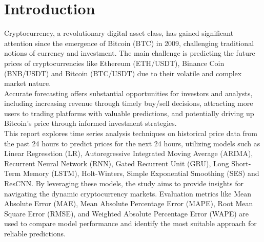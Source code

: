 \documentclass{ieeeojies}
\begin{document}
\section{Introduction}
\label{sec:introduction}
Cryptocurrency, a revolutionary digital asset class, has gained significant attention since the emergence of Bitcoin (BTC) in 2009, challenging traditional notions of currency and investment. The main challenge is predicting the future prices of cryptocurrencies like Ethereum (ETH/USDT), Binance Coin (BNB/USDT) and Bitcoin (BTC/USDT) due to their volatile and complex market nature.\\
Accurate forecasting offers substantial opportunities for investors and analysts, including increasing revenue through timely buy/sell decisions, attracting more users to trading platforms with valuable predictions, and potentially driving up Bitcoin's price through informed investment strategies.\\
This report explores time series analysis techniques on historical price data from the past 24 hours to predict prices for the next 24 hours, utilizing models such as Linear Regresstion (LR), Autoregressive Integrated Moving Average (ARIMA), Recurrent Neural Network (RNN), Gated Recurrent Unit (GRU), Long Short-Term Memory (LSTM), Holt-Winters, Simple Exponential Smoothing (SES) and ResCNN. By leveraging these models, the study aims to provide insights for navigating the dynamic cryptocurrency markets. Evaluation metrics like Mean Absolute Error (MAE), Mean Absolute Percentage Error (MAPE), Root Mean Square Error (RMSE), and Weighted Absolute Percentage Error (WAPE) are used to compare model performance and identify the most suitable approach for reliable predictions.
\end{document}
